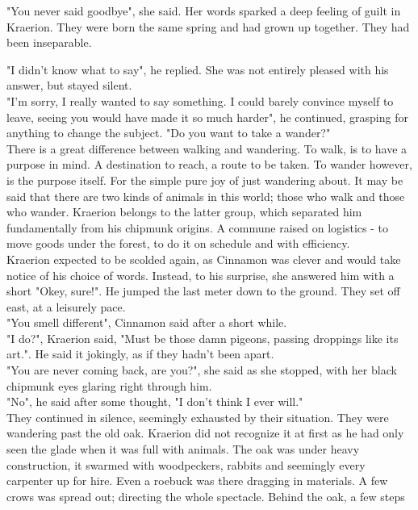 \documentclass[smalldemyvopaper,11pt,twoside,onecolumn,openright,extrafontsizes]{memoir}
\newlength\drop
\begin{document}
"You never said goodbye", she said. Her words sparked a deep feeling of guilt in Kraerion. They were born the same spring and had grown up together. They had been inseparable. 

"I didn't know what to say", he replied. She was not entirely pleased with his answer, but stayed silent.\\

"I'm sorry, I really wanted to say something. I could barely convince myself to leave, seeing you would have made it so much harder", he continued, grasping for anything to change the subject. "Do you want to take a wander?" \\ 


There is a great difference between walking and wandering. To walk, is to have a purpose in mind. A destination to reach, a route to be taken. To wander however, is the purpose itself. For the simple pure joy of just wandering about. It may be said that there are two kinds of animals in this world; those who walk and those who wander. Kraerion belongs to the latter group, which separated him fundamentally from his chipmunk origins. A commune raised on logistics - to move goods under the forest, to do it on schedule and with efficiency. \\

Kraerion expected to be scolded again, as Cinnamon was clever and would take notice of his choice of words. Instead, to his surprise, she answered him with a short "Okey, sure!". He jumped the last meter down to the ground. They set off east, at a leisurely pace. \\

"You smell different", Cinnamon said after a short while.\\

"I do?", Kraerion said, "Must be those damn pigeons, passing droppings like its art.". He said it jokingly, as if they hadn't been apart. \\

"You are never coming back, are you?", she said as she stopped, with her black chipmunk eyes glaring right through him. \\

"No", he said after some thought, "I don't think I ever will."\\

They continued in silence, seemingly exhausted by their situation. They were wandering past the old oak. Kraerion did not recognize it at first as he had only seen the glade when it was full with animals. The oak was under heavy construction, it swarmed with woodpeckers, rabbits and seemingly every carpenter up for hire. Even a roebuck was there dragging in materials. A few crows was spread out; directing the whole spectacle. Behind the oak, a few steps   
\end{document}
